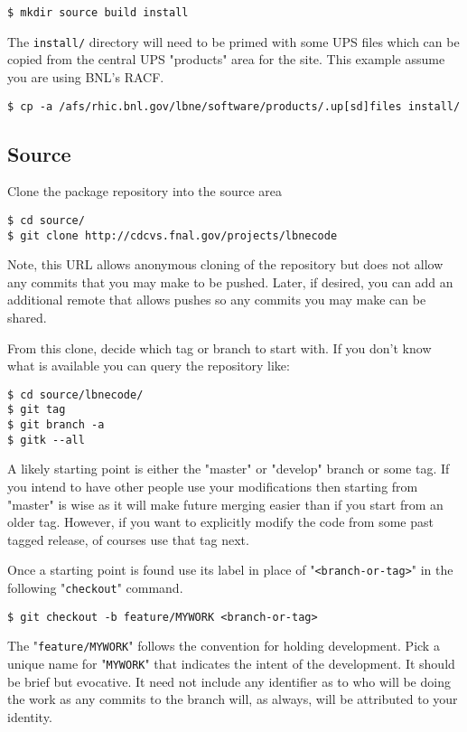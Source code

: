 \documentclass[11pt]{article}
\begin{document}
\begin{verbatim}
$ mkdir source build install
\end{verbatim}

The \texttt{install/} directory will need to be primed with some UPS files which can be copied from the central UPS "products" area for the site.  This example assume you are using BNL's RACF.

\begin{verbatim}
$ cp -a /afs/rhic.bnl.gov/lbne/software/products/.up[sd]files install/
\end{verbatim}
\subsection{Source}
\label{sec-1-2}

Clone the package repository into the source area

\begin{verbatim}
$ cd source/
$ git clone http://cdcvs.fnal.gov/projects/lbnecode
\end{verbatim}

Note, this URL allows anonymous cloning of the repository but does not allow any commits that you may make to be pushed.  Later, if desired, you can add an additional remote that allows pushes so any commits you may make can be shared.

From this clone, decide which tag or branch to start with.  If you don't know what is available you can query the repository like:

\begin{verbatim}
$ cd source/lbnecode/
$ git tag
$ git branch -a
$ gitk --all
\end{verbatim}

A likely starting point is either the "master" or "develop" branch or some tag. If you intend to have other people use your modifications then starting from "master" is wise as it will make future merging easier than if you start from an older tag.  However, if you want to explicitly modify the code from some past tagged release, of courses use that tag next.

Once a starting point is found use its label in place of "\texttt{<branch-or-tag>}" in the following "\texttt{checkout}" command.

\begin{verbatim}
$ git checkout -b feature/MYWORK <branch-or-tag>
\end{verbatim}

The "\texttt{feature/MYWORK}" follows the convention for holding development.  Pick a unique name for "\texttt{MYWORK}" that indicates the intent of the development.  It should be brief but evocative.  It need not include any identifier as to who will be doing the work as any commits to the branch will, as always, will be attributed to your identity.
\end{document}
